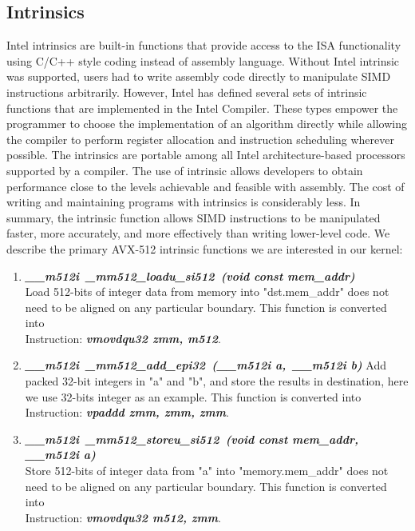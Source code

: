 \documentclass[sigconf]{acmart}
\begin{document}
\subsection{Intrinsics}
Intel intrinsics are built-in functions that provide access to the ISA functionality
using C/C++ style coding instead of assembly language. Without Intel intrinsic was
supported, users had to write assembly code directly to manipulate SIMD
instructions arbitrarily.
However, Intel has defined several sets of intrinsic functions that are implemented
in the Intel Compiler. These types empower the programmer to choose the implementation
of an algorithm directly while allowing the compiler to perform register allocation
and instruction scheduling wherever possible. The intrinsics are portable among all
Intel architecture-based processors supported by a compiler. The use of intrinsic
allows developers to obtain performance close to the levels achievable and feasible with assembly.
The cost of writing and maintaining programs with intrinsics is considerably less.
In summary, the intrinsic function allows SIMD instructions to be manipulated faster, more
accurately, and more effectively than writing lower-level code.
We describe the primary AVX-512 intrinsic functions we are interested in our kernel:

\begin{enumerate}
  \item \emph{\textbf{\textit{\_\_m512i\ \_mm512\_loadu\_si512\ (void const\* mem\_addr)}}} \\
  Load 512-bits of integer data from memory into "dst.mem\_addr" does not need to be aligned on any particular boundary.
  This function is converted into \\ Instruction: \emph{\textbf{\textit{vmovdqu32  zmm,  m512}}}.
  \item \emph{\textbf{\textit{\_\_m512i\ \_mm512\_add\_epi32\ (\_\_m512i a,\ \_\_m512i b)}}}
  Add packed 32-bit integers in "a" and "b", and store the results in destination, here we use 32-bits integer as an example.
  This function is converted into \\ Instruction: \emph{\textbf{\textit{vpaddd  zmm,  zmm,  zmm}}}.
  \item \emph{\textbf{\textit{\_\_m512i\ \_mm512\_storeu\_si512\ (void const\* mem\_addr, \_\_m512i a)}}} \\
  Store 512-bits of integer data from "a" into "memory.mem\_addr" does not need to be aligned on any particular boundary.
  This function is converted into \\ Instruction: \emph{\textbf{\textit{vmovdqu32  m512, zmm}}}.
\end{enumerate}
\end{document}
